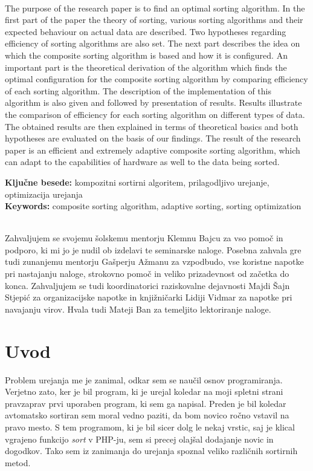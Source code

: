 \documentclass[a4paper,oneside,12pt]{article}
\begin{document}
\\[5mm]
The purpose of the research paper is to find an optimal sorting algorithm. In the first
part of the paper the theory of sorting, various sorting algorithms and their expected
behaviour on actual data are described. Two hypotheses regarding efficiency of sorting
algorithms are also set.  The next part describes the idea on which the composite sorting
algorithm is based and how it is configured. An important part is the theoretical
derivation of the algorithm which finds the optimal configuration for the composite
sorting algorithm by comparing efficiency of each sorting algorithm. The description of
the implementation of this algorithm is also given and followed by presentation of
results. Results illustrate the comparison of efficiency for each sorting algorithm on
different types of data. The obtained results are then explained in terms of theoretical
basics and both hypotheses are evaluated on the basis of our findings. The result of the
research paper is an efficient and extremely adaptive composite sorting algorithm, which
can adapt to the capabilities of hardware as well to the data being sorted.

\vfill
\noindent \textbf{Ključne besede:} kompozitni sortirni algoritem, prilagodljivo urejanje, optimizacija urejanja \\[2mm]
\textbf{Keywords:} composite sorting algorithm, adaptive sorting, sorting optimization

\pagebreak

\thispagestyle{empty}
\\[5mm]
Zahvaljujem se svojemu šolskemu mentorju Klemnu Bajcu za vso pomoč in podporo,
ki mi jo je nudil ob izdelavi te seminarske naloge.  Posebna zahvala gre tudi zunanjemu
mentorju Gašperju Ažmanu za vzpodbudo, vse koristne napotke pri nastajanju
naloge, strokovno pomoč in veliko prizadevnost od začetka do konca. Zahvaljujem
se tudi koordinatorici raziskovalne dejavnosti Majdi Šajn
Stjepić za organizacijske napotke in knjižničarki Lidiji Vidmar za napotke pri
navajanju virov. Hvala tudi Mateji Ban za temeljito lektoriranje naloge.
\pagebreak

\thispagestyle{empty}
\tableofcontents
\pagebreak
\thispagestyle{empty}
\listoffigures
\pagebreak
\thispagestyle{empty}
\listoftables
\pagebreak
\thispagestyle{empty}
\listofalgorithms
\pagebreak

\section{Uvod}
\label{chapter:uvod}
Problem urejanja me je zanimal, odkar sem se naučil osnov programiranja.
Verjetno zato, ker je bil program, ki je urejal koledar na moji spletni strani
pravzaprav prvi uporaben program, ki sem ga napisal. Preden je bil koledar 
avtomatsko sortiran sem moral vedno paziti, da bom novico ročno vstavil na pravo
mesto. S tem programom, ki je bil sicer dolg le nekaj vrstic, saj je klical
vgrajeno funkcijo \emph{sort} v PHP-ju, sem si precej olajšal dodajanje novic in dogodkov.  
Tako sem iz zanimanja do urejanja spoznal veliko različnih sortirnih metod.
\end{document}
